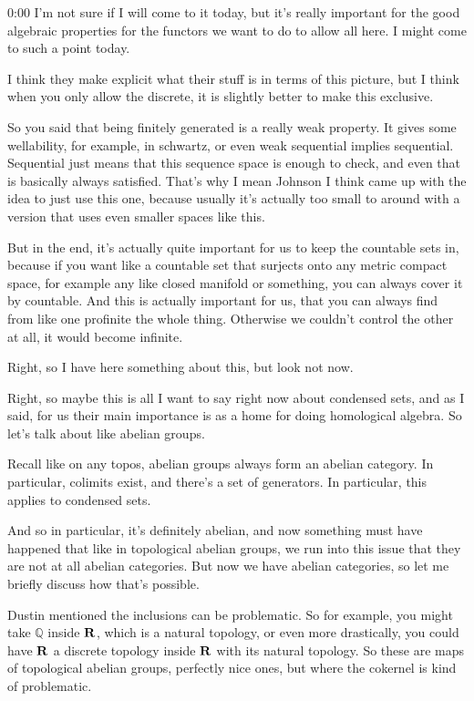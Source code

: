 \begin{unfinished}{0:00}
I'm not sure if I will come to it today, but it's really important for the good algebraic properties for the functors we want to do to allow all here. I might come to such a point today.

I think they make explicit what their stuff is in terms of this picture, but I think when you only allow the discrete, it is slightly better to make this exclusive.

So you said that being finitely generated is a really weak property. It gives some wellability, for example, in schwartz, or even weak sequential implies sequential. Sequential just means that this sequence space is enough to check, and even that is basically always satisfied. That's why I mean Johnson I think came up with the idea to just use this one, because usually it's actually too small to around with a version that uses even smaller spaces like this.

But in the end, it's actually quite important for us to keep the countable sets in, because if you want like a countable set that surjects onto any metric compact space, for example any like closed manifold or something, you can always cover it by countable. And this is actually important for us, that you can always find from like one profinite the whole thing. Otherwise we couldn't control the other at all, it would become infinite.

Right, so I have here something about this, but look not now.

Right, so maybe this is all I want to say right now about condensed sets, and as I said, for us their main importance is as a home for doing homological algebra. So let's talk about like abelian groups.

Recall like on any topos, abelian groups always form an abelian category. In particular, colimits exist, and there's a set of generators. In particular, this applies to condensed sets.

And so in particular, it's definitely abelian, and now something must have happened that like in topological abelian groups, we run into this issue that they are not at all abelian categories. But now we have abelian categories, so let me briefly discuss how that's possible.

Dustin mentioned the inclusions can be problematic. So for example, you might take $\mathbb{Q}$ inside $\mathbf R$, which is a natural topology, or even more drastically, you could have $\mathbf R$ a discrete topology inside $\mathbf R$ with its natural topology. So these are maps of topological abelian groups, perfectly nice ones, but where the cokernel is kind of problematic.


\end{unfinished}
